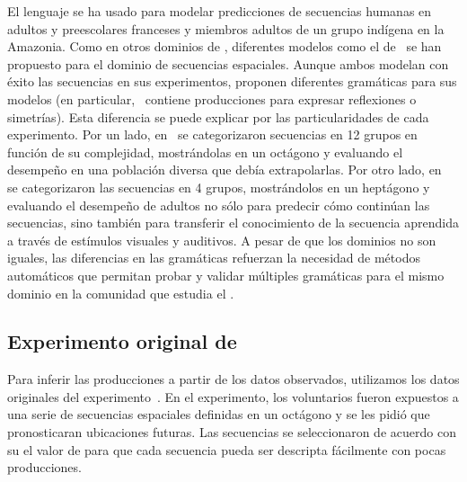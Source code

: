 El lenguaje \gramgeo se ha usado para modelar predicciones de secuencias humanas en adultos y preescolares franceses y miembros adultos de un grupo indígena en la Amazonia. Como en otros dominios de \lot, diferentes modelos como el de~\cite{yildirim2015learning} se han propuesto para el dominio de secuencias espaciales. Aunque ambos modelan con éxito las secuencias en sus experimentos, proponen diferentes gramáticas para sus modelos (en particular,~\cite{amalric2017language} contiene producciones para expresar reflexiones o simetrías). Esta diferencia se puede explicar por las particularidades de cada experimento. Por un lado, en~\cite{amalric2017language} se categorizaron secuencias en 12 grupos en función de su complejidad, mostrándolas en un octágono y evaluando el desempeño en una población diversa que debía extrapolarlas. Por otro lado, en~\cite{yildirim2015learning} se categorizaron las secuencias en 4 grupos, mostrándolos en un heptágono y evaluando el desempeño de adultos no sólo para predecir cómo continúan las secuencias, sino también para transferir el conocimiento de la secuencia aprendida a través de estímulos visuales y auditivos. A pesar de que los dominios no son iguales, las diferencias en las gramáticas refuerzan la necesidad de métodos automáticos que permitan probar y validar múltiples gramáticas para el mismo dominio en la comunidad que estudia el \lot.


\subsection{Experimento original de \gramgeo}


Para inferir las producciones a partir de los datos observados, utilizamos los datos originales del experimento~\cite{amalric2017language}. En el experimento, los voluntarios fueron expuestos a una serie de secuencias espaciales definidas en un octágono y se les pidió que pronosticaran ubicaciones futuras. Las secuencias se seleccionaron de acuerdo con su el valor de \mdlgeo para que cada secuencia pueda ser descripta fácilmente con pocas producciones.

